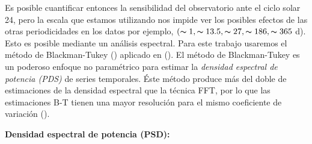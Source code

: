 Es posible cuantificar entonces la sensibilidad del observatorio ante el ciclo solar 24, pero la escala que estamos utilizando nos impide ver los posibles efectos de las otras periodicidades en los datos por ejemplo, $( \thicksim 1, \thicksim13.5,\thicksim27, \thicksim186, \thicksim365$ d). Esto es posible mediante un análisis espectral. Para este trabajo usaremos el método de Blackman-Tukey (\cite{blackman}) aplicado en (\cite{noelia_2023}). El método de Blackman-Tukey es un poderoso enfoque no paramétrico para estimar la \textit{densidad espectral de potencia (PDS)} de series temporales. Éste método produce más del doble de estimaciones de la densidad espectral que la técnica FFT, por lo que las estimaciones B-T tienen una mayor resolución para el mismo coeficiente de variación (\cite{edge_1970}). 


\textbf{Densidad espectral de potencia (PSD):}

